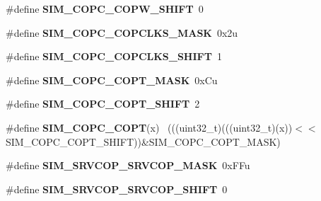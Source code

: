 \begin{DoxyCompactItemize}
\item 
\hypertarget{group___s_i_m___register___masks_ga219c76cc0f76e8ba2cbe438cb80cb6cc}{}\#define {\bfseries S\+I\+M\+\_\+\+C\+O\+P\+C\+\_\+\+C\+O\+P\+W\+\_\+\+S\+H\+I\+F\+T}~0\label{group___s_i_m___register___masks_ga219c76cc0f76e8ba2cbe438cb80cb6cc}

\item 
\hypertarget{group___s_i_m___register___masks_ga05e787905b2cb2c97a688a31c461235f}{}\#define {\bfseries S\+I\+M\+\_\+\+C\+O\+P\+C\+\_\+\+C\+O\+P\+C\+L\+K\+S\+\_\+\+M\+A\+S\+K}~0x2u\label{group___s_i_m___register___masks_ga05e787905b2cb2c97a688a31c461235f}

\item 
\hypertarget{group___s_i_m___register___masks_ga61c1964987078934db4ab11e5358b51a}{}\#define {\bfseries S\+I\+M\+\_\+\+C\+O\+P\+C\+\_\+\+C\+O\+P\+C\+L\+K\+S\+\_\+\+S\+H\+I\+F\+T}~1\label{group___s_i_m___register___masks_ga61c1964987078934db4ab11e5358b51a}

\item 
\hypertarget{group___s_i_m___register___masks_gaf9109bf584bb00c7c6bcf002582b2905}{}\#define {\bfseries S\+I\+M\+\_\+\+C\+O\+P\+C\+\_\+\+C\+O\+P\+T\+\_\+\+M\+A\+S\+K}~0x\+Cu\label{group___s_i_m___register___masks_gaf9109bf584bb00c7c6bcf002582b2905}

\item 
\hypertarget{group___s_i_m___register___masks_gafc24142fbaab3d1f12a325df24e7887f}{}\#define {\bfseries S\+I\+M\+\_\+\+C\+O\+P\+C\+\_\+\+C\+O\+P\+T\+\_\+\+S\+H\+I\+F\+T}~2\label{group___s_i_m___register___masks_gafc24142fbaab3d1f12a325df24e7887f}

\item 
\hypertarget{group___s_i_m___register___masks_ga890e670284374ab35a25d29c5c047e27}{}\#define {\bfseries S\+I\+M\+\_\+\+C\+O\+P\+C\+\_\+\+C\+O\+P\+T}(x)                                              ~(((uint32\+\_\+t)(((uint32\+\_\+t)(x))$<$$<$S\+I\+M\+\_\+\+C\+O\+P\+C\+\_\+\+C\+O\+P\+T\+\_\+\+S\+H\+I\+F\+T))\&S\+I\+M\+\_\+\+C\+O\+P\+C\+\_\+\+C\+O\+P\+T\+\_\+\+M\+A\+S\+K)\label{group___s_i_m___register___masks_ga890e670284374ab35a25d29c5c047e27}

\item 
\hypertarget{group___s_i_m___register___masks_gab4c335374c03a075c320d522e7df0198}{}\#define {\bfseries S\+I\+M\+\_\+\+S\+R\+V\+C\+O\+P\+\_\+\+S\+R\+V\+C\+O\+P\+\_\+\+M\+A\+S\+K}~0x\+F\+Fu\label{group___s_i_m___register___masks_gab4c335374c03a075c320d522e7df0198}

\item 
\hypertarget{group___s_i_m___register___masks_ga66e056e11b3573007a32850a12dae975}{}\#define {\bfseries S\+I\+M\+\_\+\+S\+R\+V\+C\+O\+P\+\_\+\+S\+R\+V\+C\+O\+P\+\_\+\+S\+H\+I\+F\+T}~0\label{group___s_i_m___register___masks_ga66e056e11b3573007a32850a12dae975}


\end{DoxyCompactItemize}
